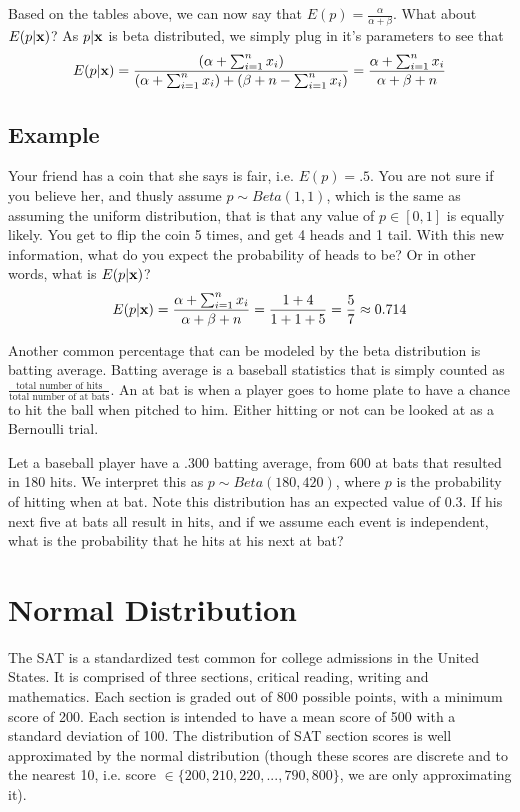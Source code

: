 Based on the tables above, we can now say that $E(p) = \frac{\alpha}{\alpha +\beta}$. What about $E(p|{\bf x})$? As $p|{\bf x}$ is beta distributed, we simply plug in it's parameters to see that 
\[
E(p|{\bf x})=\frac{(\alpha+\sum_{i=1}^n x_i)}{(\alpha+\sum_{i=1}^n x_i)+(\beta+n-\sum_{i=1}^n x_i)} =\frac{\alpha+\sum_{i=1}^n x_i}{\alpha+ \beta+n}
\]

\subsection*{Example}
Your friend has a coin that she says is fair, i.e. $E(p)=.5$. You are not sure if you believe her, and thusly assume $p \sim Beta(1,1)$, which is the same as assuming the uniform distribution, that is that any value of $p \in [0,1]$ is equally likely. You get to flip the coin 5 times, and get 4 heads and 1 tail. With this new information, what do you expect the probability of heads to be? Or in other words, what is $E(p|{\bf x})$?
\[
E(p|{\bf x}) = \frac{\alpha+\sum_{i=1}^n x_i}{\alpha+ \beta+n} = \frac{1+4}{1+ 1+5} =  \frac{5}{7} \approx 0.714
\]

Another common percentage that can be modeled by the beta distribution is batting average. Batting average is a baseball statistics that is simply counted as $\frac{\text{total number of hits}}{\text{total number of at bats}}$. An at bat is when a player goes to home plate to have a chance to hit the ball when pitched to him. Either hitting or not can be looked at as a Bernoulli trial. 

\begin{problem}
Let a baseball player have a $.300$ batting average, from 600 at bats that resulted in 180 hits. We interpret this as $p \sim Beta(180,420)$, where $p$ is the probability of hitting when at bat. Note this distribution has an expected value of 0.3. If his next five at bats all result in hits, and if we assume each event is independent, what is the probability that he hits at his next at bat? 
\end{problem}

\section*{Normal Distribution}
The SAT is a standardized test common for college admissions in the United States. 
It is comprised of three sections, critical reading, writing and mathematics. 
Each section is graded out of 800 possible points, with a minimum score of 200.
Each section is intended to have a mean score of 500 with a standard deviation of 100.  
The distribution of SAT section scores is well approximated by the normal distribution 
(though these scores are discrete and to the nearest 10, i.e. score $\in \{200,210,220,...,790,800\}$, we are only approximating it). 

